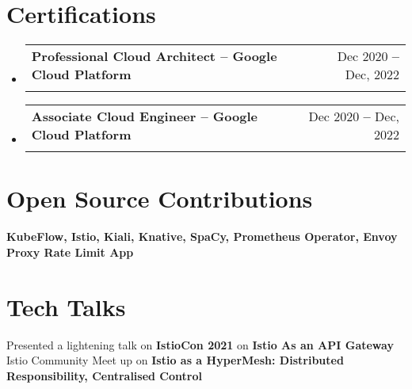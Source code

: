 \documentclass[letterpaper,11pt]{article}
\makeatletter
\newcommand{\resumeSubheading}[4]{
  \vspace{-2pt}\item
    \begin{tabular*}{0.97\textwidth}[t]{l@{\extracolsep{\fill}}r}
      \textbf{#1} & #2 \\
      \textit{\small#3} & \textit{\small #4} \\
    \end{tabular*}\vspace{-7pt}
}
\newcommand{\resumeSubHeadingListStart}{\begin{itemize}[leftmargin=0.15in, label={}]}
\newcommand{\resumeSubHeadingListEnd}{\end{itemize}}
\makeatother
\begin{document}

\section{Certifications}
  \vspace{3pt}
  \resumeSubHeadingListStart
    
    \resumeSubheading
      {Professional Cloud Architect \textbf{--} Google Cloud Platform}{Dec 2020 \textbf{--} Dec, 2022}
      {}{}
      \vspace{-15pt}
    \resumeSubheading
      {Associate Cloud Engineer \textbf{--} Google Cloud Platform}{Dec 2020 \textbf{--} Dec, 2022}
      {}{}
  \resumeSubHeadingListEnd



\section{Open Source Contributions}
    \vspace{3pt}
  \resumeSubHeadingListStart
    \small{\item{
        \textbf{KubeFlow, Istio, Kiali, Knative, SpaCy, Prometheus Operator, Envoy Proxy Rate Limit App} \\ \vspace{3pt}
    }}
 \resumeSubHeadingListEnd



\section{Tech Talks}
  \vspace{3pt}
  \resumeSubHeadingListStart
    \small{\item{
        {Presented a lightening talk on \textbf{IstioCon 2021} on \textbf{Istio As an API Gateway}} \\ \vspace{3pt}
        {Istio Community Meet up on \textbf{Istio as a HyperMesh: Distributed Responsibility, Centralised Control}}
    }}
 \resumeSubHeadingListEnd








    



\end{document}

